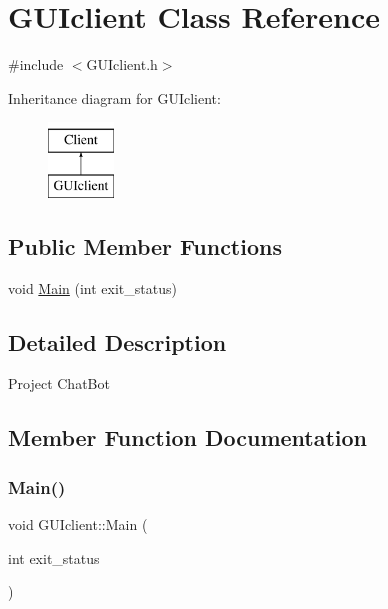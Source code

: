 \hypertarget{classGUIclient}{}\section{G\+U\+Iclient Class Reference}
\label{classGUIclient}


{\ttfamily \#include $<$G\+U\+Iclient.\+h$>$}

Inheritance diagram for G\+U\+Iclient\+:\begin{figure}[H]
\begin{center}
\leavevmode
\includegraphics[height=2.000000cm]{classGUIclient}
\end{center}
\end{figure}
\subsection*{Public Member Functions}
\begin{DoxyCompactItemize}
\item 
void \mbox{\hyperlink{classGUIclient_aa78d5fe6aabaa8777bf79c60ba6ec301}{Main}} (int exit\+\_\+status)
\end{DoxyCompactItemize}


\subsection{Detailed Description}
Project Chat\+Bot 

\subsection{Member Function Documentation}
\mbox{\label{classGUIclient_aa78d5fe6aabaa8777bf79c60ba6ec301}} 
\subsubsection{\texorpdfstring{Main()}{Main()}}
{\footnotesize\ttfamily void G\+U\+Iclient\+::\+Main (\begin{DoxyParamCaption}\item[{int}]{exit\+\_\+status }\end{DoxyParamCaption})}


